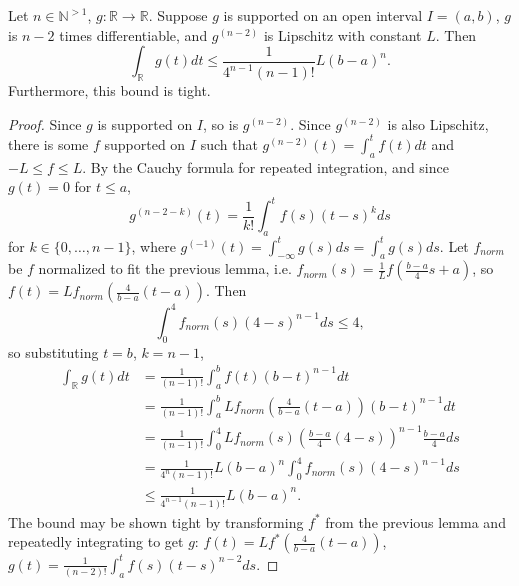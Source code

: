 \documentclass{article}
\begin{document}
\begin{theorem}
  Let $n \in \mathbb{N}^{>1}$, $g : \mathbb{R} \rightarrow \mathbb{R}$.
  Suppose $g$ is supported on an open interval $I = (a, b)$,
  $g$ is $n-2$ times differentiable,
  and $g^{(n-2)}$ is Lipschitz with constant $L$.
  Then
  \[
  \int_\mathbb{R} g(t) dt \leq \frac{1}{4^{n-1}(n-1)!}L(b-a)^n.
  \]
  Furthermore, this bound is tight.
\end{theorem}
\begin{proof}
  Since $g$ is supported on $I$, so is $g^{(n-2)}$.
  Since $g^{(n-2)}$ is also Lipschitz,
  there is some $f$ supported on $I$ such that
  $g^{(n-2)}(t) = \int_a^t f(t) dt$
  and $-L \leq f \leq L$.
  By the Cauchy formula for repeated integration,
  and since $g(t) = 0$ for $t \leq a$,
  \[
  g^{(n-2-k)}(t) = \frac{1}{k!}\int_a^t f(s)(t-s)^kds
  \]
  for $k \in \{0, \ldots, n-1\}$,
  where $g^{(-1)}(t) = \int_{-\infty}^tg(s)ds = \int_a^tg(s)ds$.
  Let $f_{norm}$ be $f$ normalized to fit the previous lemma,
  i.e. $f_{norm}(s) = \frac{1}{L}f\left(\frac{b-a}{4}s+a\right)$,
  so $f(t) = Lf_{norm}\left(\frac{4}{b-a}(t-a)\right)$.
  Then
  \[
  \int_0^4f_{norm}(s)(4-s)^{n-1}ds \leq 4,
  \]
  so substituting $t = b$, $k = n-1$,
  \begin{align*}
    \int_\mathbb{R}g(t)dt
    &= \frac{1}{(n-1)!}\int_a^bf(t)(b-t)^{n-1}dt \\
    &= \frac{1}{(n-1)!}\int_a^bLf_{norm}\left(\frac{4}{b-a}(t-a)\right)(b-t)^{n-1}dt \\
    &= \frac{1}{(n-1)!}\int_0^4Lf_{norm}(s) \left(\frac{b-a}{4}(4-s)\right)^{n-1}\frac{b-a}{4} ds \\
    &= \frac{1}{4^n(n-1)!}L(b-a)^n\int_0^4f_{norm}(s) (4-s)^{n-1} ds \\
    &\leq \frac{1}{4^{n-1}(n-1)!}L(b-a)^n.
  \end{align*}
  The bound may be shown tight by transforming $f^*$ from the previous lemma
  and repeatedly integrating to get $g$:
  $f(t) = Lf^*\left(\frac{4}{b-a}(t-a)\right)$,
  $g(t) = \frac{1}{(n-2)!}\int_a^tf(s)(t-s)^{n-2}ds$.
\end{proof}
\end{document}
